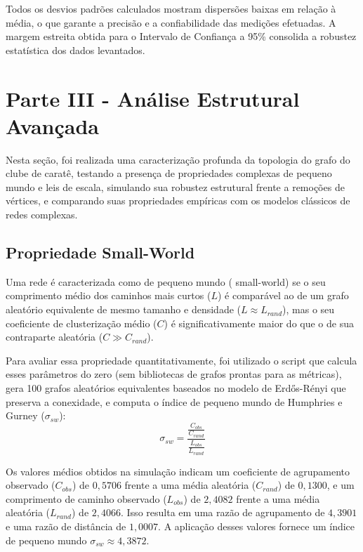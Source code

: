 \documentclass[sigconf,nonacm]{webmedia}
\begin{document}
Todos os desvios padrões calculados mostram dispersões baixas em relação à média, o que garante a precisão e a confiabilidade das medições efetuadas. A margem estreita obtida para o Intervalo de Confiança a 95\% consolida a robustez estatística dos dados levantados.

\section{Parte III - Análise Estrutural Avançada}
\label{sec:parte_iii}

Nesta seção, foi realizada uma caracterização profunda da topologia do grafo do clube de caratê, testando a presença de propriedades complexas de pequeno mundo e leis de escala, simulando sua robustez estrutural frente a remoções de vértices, e comparando suas propriedades empíricas com os modelos clássicos de redes complexas.

\subsection{Propriedade Small-World}
\label{subsec:small_world}

Uma rede é caracterizada como de pequeno mundo ( {small-world}) se o seu comprimento médio dos caminhos mais curtos ($L$) é comparável ao de um grafo aleatório equivalente de mesmo tamanho e densidade ($L \approx L_{rand}$), mas o seu coeficiente de clusterização médio ($C$) é significativamente maior do que o de sua contraparte aleatória ($C \gg C_{rand}$).

Para avaliar essa propriedade quantitativamente, foi utilizado o script  que calcula esses parâmetros do zero (sem bibliotecas de grafos prontas para as métricas), gera 100 grafos aleatórios equivalentes baseados no modelo de Erdős-Rényi que preserva a conexidade, e computa o índice de pequeno mundo de Humphries e Gurney ($\sigma_{sw}$):
\begin{equation}
    \sigma_{sw} = \frac{\frac{C_{obs}}{C_{rand}}}{\frac{L_{obs}}{L_{rand}}}
\end{equation}

Os valores médios obtidos na simulação indicam um coeficiente de agrupamento observado ($C_{obs}$) de $0,5706$ frente a uma média aleatória ($C_{rand}$) de $0,1300$, e um comprimento de caminho observado ($L_{obs}$) de $2,4082$ frente a uma média aleatória ($L_{rand}$) de $2,4066$. Isso resulta em uma razão de agrupamento de $4,3901$ e uma razão de distância de $1,0007$. A aplicação desses valores fornece um índice de pequeno mundo $\sigma_{sw} \approx 4,3872$.
\end{document}

